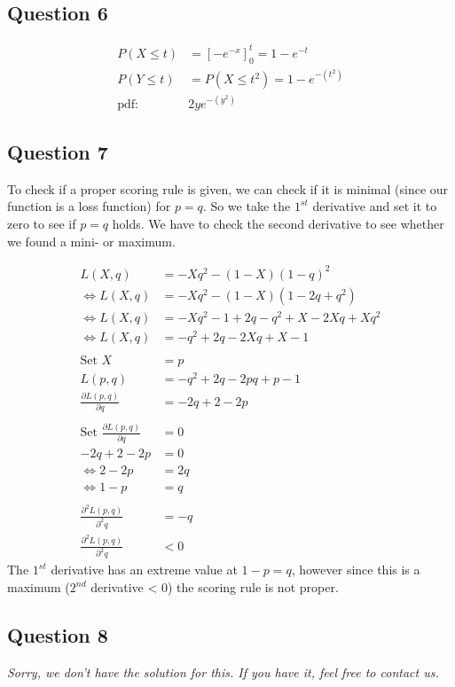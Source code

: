 \documentclass[../main/Notes.tex]{subfiles}
\begin{document}



\subsection*{Question 6}
\begin{align*}
P(X\leq t) &= \left[-e^{-x}\right]_0^t=1-e^{-t} \\
P(Y\leq t) &= P(X\leq t^2)=1-e^{-\left(t^2\right)} \\
\text{pdf: }&2ye^{-\left(y^2\right)}
\end{align*}



\subsection*{Question 7}
To check if a proper scoring rule is given, we can check if it is minimal (since our function is a loss function) for $p=q$. So we take the $1^{st}$ derivative and set it to zero to see if $p=q$ holds. We have to check the second derivative to see whether we found a mini- or maximum.

\begin{align*}
                L(X,q) &= -Xq^2-(1-X)(1-q)^2 \\
\Leftrightarrow L(X,q) &= -Xq^2-(1-X)(1-2q+q^2) \\
\Leftrightarrow L(X,q) &= -Xq^2-1+2q-q^2+X-2Xq+Xq^2 \\
\Leftrightarrow L(X,q) &= -q^2+2q-2Xq+X-1 \\
\\
\text{Set }X&=p \\
L(p,q) &= -q^2+2q-2pq+p-1 \\
\frac{\partial L(p,q)}{\partial q} &= -2q+2-2p \\
\\
\text{Set }\frac{\partial L(p,q)}{\partial q}&=0 \\
-2q+2-2p &= 0\\
\Leftrightarrow 2-2p&=2q \\
\Leftrightarrow 1-p&=q \\
\\
\frac{\partial^2 L(p,q)}{\partial^2 q} &= -q \\
\frac{\partial^2 L(p,q)}{\partial^2 q} &< 0
\end{align*}
The $1^{st}$ derivative has an extreme value at $1-p=q$, however since this is a maximum ($2^{nd}$ derivative < 0) the scoring rule is not proper.



\subsection*{Question 8}
\emph{Sorry, we don't have the solution for this. If you have it, feel free to contact us.}
\end{document}
